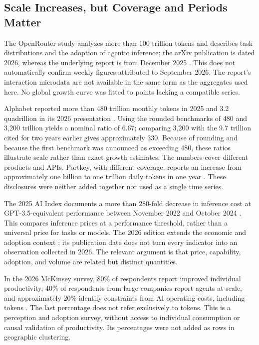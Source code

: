 \documentclass[11pt,a4paper]{article}
\begin{document}
\subsection{Scale Increases, but Coverage and Periods Matter}
The OpenRouter study analyzes more than 100 trillion tokens and describes task distributions and the adoption of agentic inference; the arXiv publication is dated 2026, whereas the underlying report is from December 2025 \cite{openrouter2026}. This does not automatically confirm weekly figures attributed to September 2026. The report's interaction microdata are not available in the same form as the aggregates used here. No global growth curve was fitted to points lacking a compatible series.

Alphabet reported more than 480 trillion monthly tokens in 2025 and 3.2 quadrillion in its 2026 presentation \cite{google2025,google2026}. Using the rounded benchmarks of 480 and 3,200 trillion yields a nominal ratio of 6.67; comparing 3,200 with the 9.7 trillion cited for two years earlier gives approximately 330. Because of rounding and because the first benchmark was announced as exceeding 480, these ratios illustrate scale rather than exact growth estimates. The numbers cover different products and APIs. Portkey, with different coverage, reports an increase from approximately one billion to one trillion daily tokens in one year \cite{portkey2026}. These disclosures were neither added together nor used as a single time series.

The 2025 AI Index documents a more than 280-fold decrease in inference cost at GPT-3.5-equivalent performance between November 2022 and October 2024 \cite{stanford2025}. This compares inference prices at a performance threshold, rather than a universal price for tasks or models. The 2026 edition extends the economic and adoption context \cite{stanford2026}; its publication date does not turn every indicator into an observation collected in 2026. The relevant argument is that price, capability, adoption, and volume are related but distinct quantities.

In the 2026 McKinsey survey, 80\% of respondents report improved individual productivity, 40\% of respondents from large companies report agents at scale, and approximately 20\% identify constraints from AI operating costs, including tokens \cite{mckinsey2026}. The last percentage does not refer exclusively to tokens. This is a perception and adoption survey, without access to individual consumption or causal validation of productivity. Its percentages were not added as rows in geographic clustering.
\end{document}
